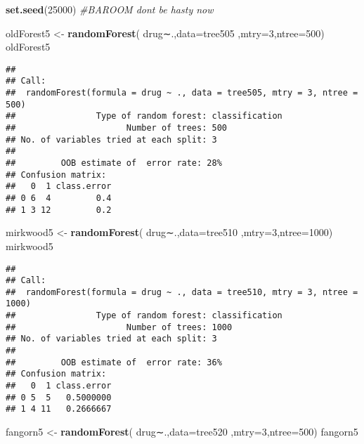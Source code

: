 \documentclass[]{article}
\newenvironment{Shaded}{\begin{snugshade}}{\end{snugshade}}
\newcommand{\KeywordTok}[1]{\textcolor[rgb]{0.13,0.29,0.53}{\textbf{#1}}}
\newcommand{\DataTypeTok}[1]{\textcolor[rgb]{0.13,0.29,0.53}{#1}}
\newcommand{\DecValTok}[1]{\textcolor[rgb]{0.00,0.00,0.81}{#1}}
\newcommand{\StringTok}[1]{\textcolor[rgb]{0.31,0.60,0.02}{#1}}
\newcommand{\CommentTok}[1]{\textcolor[rgb]{0.56,0.35,0.01}{\textit{#1}}}
\newcommand{\NormalTok}[1]{#1}
\begin{document}
\begin{Shaded}
\begin{Highlighting}[]
\KeywordTok{set.seed}\NormalTok{(}\DecValTok{25000}\NormalTok{)}
\CommentTok{#BAROOM dont be hasty now}

\NormalTok{oldForest5 <-}\StringTok{ }\KeywordTok{randomForest}\NormalTok{( drug∼.,}\DataTypeTok{data=}\NormalTok{tree505  ,}\DataTypeTok{mtry=}\DecValTok{3}\NormalTok{,}\DataTypeTok{ntree=}\DecValTok{500}\NormalTok{)}
\NormalTok{oldForest5}
\end{Highlighting}
\end{Shaded}

\begin{verbatim}
## 
## Call:
##  randomForest(formula = drug ~ ., data = tree505, mtry = 3, ntree = 500) 
##                Type of random forest: classification
##                      Number of trees: 500
## No. of variables tried at each split: 3
## 
##         OOB estimate of  error rate: 28%
## Confusion matrix:
##   0  1 class.error
## 0 6  4         0.4
## 1 3 12         0.2
\end{verbatim}

\begin{Shaded}
\begin{Highlighting}[]
\NormalTok{mirkwood5 <-}\StringTok{ }\KeywordTok{randomForest}\NormalTok{( drug∼.,}\DataTypeTok{data=}\NormalTok{tree510  ,}\DataTypeTok{mtry=}\DecValTok{3}\NormalTok{,}\DataTypeTok{ntree=}\DecValTok{1000}\NormalTok{)}
\NormalTok{mirkwood5}
\end{Highlighting}
\end{Shaded}

\begin{verbatim}
## 
## Call:
##  randomForest(formula = drug ~ ., data = tree510, mtry = 3, ntree = 1000) 
##                Type of random forest: classification
##                      Number of trees: 1000
## No. of variables tried at each split: 3
## 
##         OOB estimate of  error rate: 36%
## Confusion matrix:
##   0  1 class.error
## 0 5  5   0.5000000
## 1 4 11   0.2666667
\end{verbatim}

\begin{Shaded}
\begin{Highlighting}[]
\NormalTok{fangorn5 <-}\StringTok{ }\KeywordTok{randomForest}\NormalTok{( drug∼.,}\DataTypeTok{data=}\NormalTok{tree520  ,}\DataTypeTok{mtry=}\DecValTok{3}\NormalTok{,}\DataTypeTok{ntree=}\DecValTok{500}\NormalTok{)}
\NormalTok{fangorn5}
\end{Highlighting}
\end{Shaded}
\end{document}
